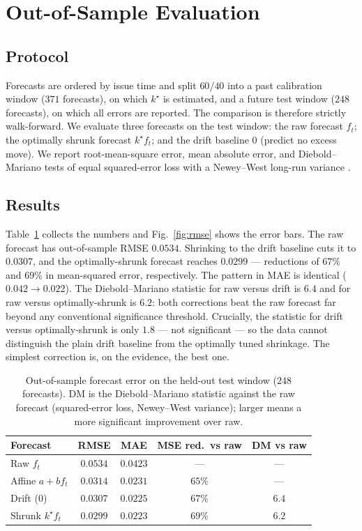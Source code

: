 \documentclass[10pt,twocolumn,twoside]{eec_style}
\newcommand{\fig}[1]{Fig.~\ref{fig:#1}}
\newcommand{\tab}[1]{Table~\ref{tab:#1}}
\begin{document}
\section{Out-of-Sample Evaluation}
\label{sec:results}
\subsection{Protocol}
Forecasts are ordered by issue time and split $60/40$ into a past calibration window
($371$ forecasts), on which $k^\star$ is estimated, and a future test window ($248$
forecasts), on which all errors are reported. The comparison is therefore strictly
walk-forward. We evaluate three forecasts on the test window: the raw forecast $f_t$;
the optimally shrunk forecast $k^\star f_t$; and the drift baseline $0$ (predict no
excess move). We report root-mean-square error, mean absolute error, and
Diebold--Mariano tests of equal squared-error loss with a Newey--West long-run variance
\cite{diebold1995}.

\subsection{Results}
\tab{oos} collects the numbers and \fig{rmse} shows the error bars. The raw forecast
has out-of-sample RMSE $0.0534$. Shrinking to the drift baseline cuts it to $0.0307$,
and the optimally-shrunk forecast reaches $0.0299$ --- reductions of $67\%$ and $69\%$
in mean-squared error, respectively. The pattern in MAE is identical ($0.042 \to 0.022$).
The Diebold--Mariano statistic for raw versus drift is $6.4$ and for raw versus
optimally-shrunk is $6.2$: both corrections beat the raw forecast far beyond any
conventional significance threshold. Crucially, the statistic for drift versus
optimally-shrunk is only $1.8$ --- not significant --- so the data cannot distinguish the
plain drift baseline from the optimally tuned shrinkage. The simplest correction is, on the
evidence, the best one.

\begin{table}[!t]
\footnotesize
\centering
\caption{Out-of-sample forecast error on the held-out test window ($248$ forecasts).
DM is the Diebold--Mariano statistic against the raw forecast (squared-error loss,
Newey--West variance); larger means a more significant improvement over raw.}
\label{tab:oos}
\vspace{2pt}
\begin{tabular}{lcccc}
\toprule
Forecast & RMSE & MAE & MSE red.\ vs raw & DM vs raw \\
\midrule
Raw $f_t$               & $0.0534$ & $0.0423$ & ---     & ---  \\
Affine $a+b f_t$        & $0.0314$ & $0.0231$ & $65\%$  & --- \\
Drift ($0$)             & $0.0307$ & $0.0225$ & $67\%$  & $6.4$ \\
Shrunk $k^\star f_t$    & $0.0299$ & $0.0223$ & $69\%$  & $6.2$ \\
\bottomrule
\end{tabular}
\end{table}
\end{document}
